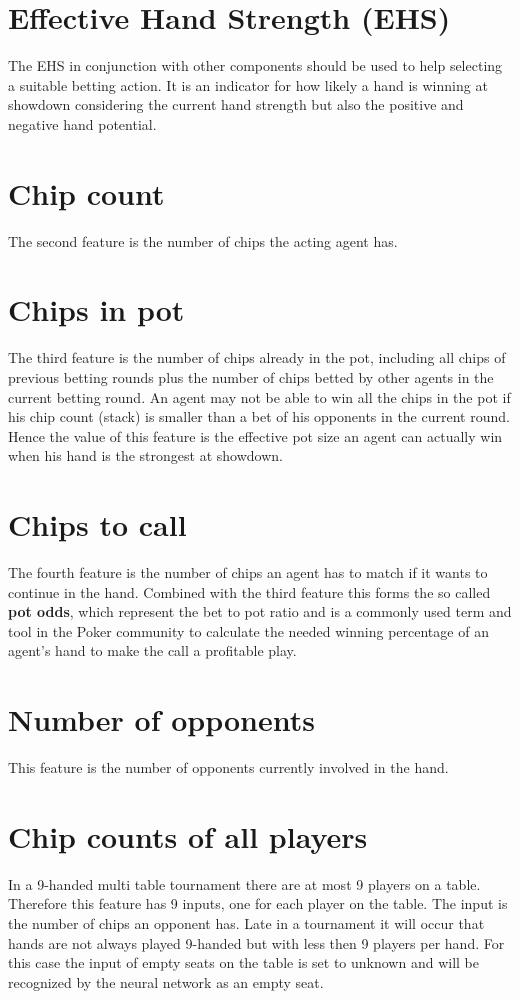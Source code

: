 \section{Effective Hand Strength (EHS)}
The EHS in conjunction with other components should be used to help selecting a suitable betting action. It is an indicator for how likely a hand is winning at showdown considering the current hand strength but also the positive and negative hand potential.
\section{Chip count}
The second feature is the number of chips the acting agent has. 
\section{Chips in pot}
The third feature is the number of chips already in the pot, including all chips of previous betting rounds plus the number of chips betted by other agents in the current betting round. An agent may not be able to win all the chips in the pot if his chip count (stack) is smaller than a bet of his opponents in the current round. Hence the value of this feature is the effective pot size an agent can actually win when his hand is the strongest at showdown.
\section{Chips to call}
The fourth feature is the number of chips an agent has to match if it wants to continue in the hand. Combined with the third feature this forms the so called \textbf{pot odds}, which represent the bet to pot ratio and is a commonly used term and tool in the Poker community to calculate the needed winning percentage of an agent's hand to make the call a profitable play.
\section{Number of opponents}
This feature is the number of opponents currently involved in the hand.
\section{Chip counts of all players}
In a 9-handed multi table tournament there are at most 9 players on a table. Therefore this feature has 9 inputs, one for each player on the table. The input is the number of chips an opponent has. Late in a tournament it will occur that hands are not always played 9-handed but with less then 9 players per hand. For this case the input of empty seats on the table is set to unknown and will be recognized by the neural network as an empty seat.
